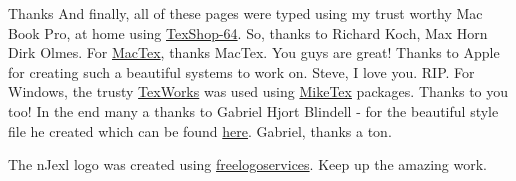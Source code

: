 \begin{subsection}{Thanks}
And finally, all of these pages were typed using my trust worthy Mac Book Pro, at home using \href{http://pages.uoregon.edu/koch/texshop}{TexShop-64}.
So, thanks to Richard Koch, Max Horn Dirk Olmes. For \href{http://tug.org/mactex/}{MacTex}, thanks MacTex. You guys are great!
Thanks to Apple for creating such a beautiful systems to work on. Steve, I love you. RIP.
For Windows, the trusty \href{http://www.tug.org/texworks}{TexWorks} was used using \href{http://miktex.org}{MikeTex} packages. Thanks to you too!
In the end many a thanks to Gabriel Hjort Blindell - for the beautiful style file he created which can be found 
\href{http://gabriel.hjort.blindell.se/publications/documents/thesis-template.tar.gz}{here}. Gabriel, thanks a ton.

The nJexl logo was created using \href{http://www.freelogoservices.com/}{freelogoservices}. 
Keep up the amazing work.

\end{subsection}